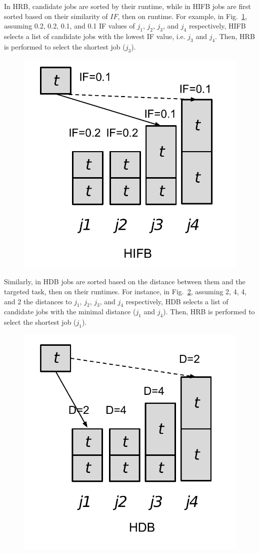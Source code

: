 \documentclass[final]{IEEEtran}
\begin{document}
In HRB, candidate jobs are sorted by their runtime, while in HIFB jobs are first sorted based on their similarity of $IF$, then on runtime. For example, in Fig.~\ref{fig:algorithm_hifb}, assuming 0.2, 0.2, 0.1, and 0.1 IF values of $j_1$, $j_2$, $j_3$, and $j_4$ respectively, HIFB selects a list of candidate jobs with the lowest IF value, i.e. $j_3$ and $j_4$. Then, HRB is performed to select the shortest job ($j_3$). 

\begin{figure}[htb]
	\centering
	\includegraphics[width=0.5\linewidth]{figure/algorithm_hifb.pdf}
	\label{fig:algorithm_hifb}
	\vspace{-15pt}
\end{figure}

Similarly, in HDB jobs are sorted based on the distance between them and the targeted task, then on their runtimes. For instance, in Fig.~\ref{fig:algorithm_hdb}, assuming 2, 4, 4, and 2 the distances to $j_1$, $j_2$, $j_3$, and $j_4$ respectively, HDB selects a list of candidate jobs with the minimal distance ($j_1$ and $j_4$). Then, HRB is performed to select the shortest job ($j_1$). 

\begin{figure}[htb]
	\centering
	\includegraphics[width=0.5\linewidth]{figure/algorithm_hdb.pdf}
	\label{fig:algorithm_hdb}
	\vspace{-15pt}
\end{figure}
\end{document}
